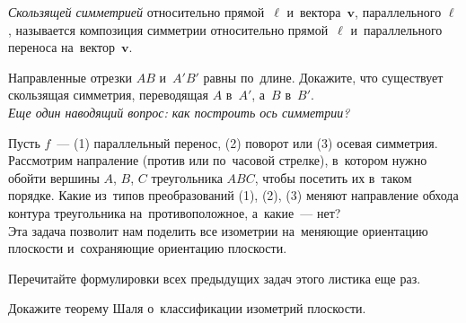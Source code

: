 \emph{Скользящей симметрией} относительно прямой~$\ell$ и~вектора~$\mathbf{v}$,
параллельного $\ell$, называется композиция симметрии относительно
прямой~$\ell$ и~параллельного переноса на~вектор~$\mathbf{v}$.

\begin{problems}

\item
Направленные отрезки $AB$ и~$A'B'$ равны по~длине.
Докажите, что существует скользящая симметрия, переводящая $A$ в~$A'$,
а~$B$ в~$B'$.
\\
\emph{Еще один наводящий вопрос: как построить ось симметрии?}

\item
Пусть $f$~---\enspace
(1) параллельный перенос,
\enspace
(2) поворот
\enspace или\enspace
(3) осевая симметрия.
\\
Рассмотрим напраление (против или по~часовой стрелке), в~котором нужно обойти
вершины $A$, $B$, $C$ треугольника $ABC$, чтобы посетить их в~таком порядке.
Какие из~типов преобразований (1), (2), (3) меняют направление обхода контура
треугольника на~противоположное, а~какие~--- нет?
\\
Эта задача позволит нам поделить все изометрии на~меняющие ориентацию плоскости
и~сохраняющие ориентацию плоскости.

\item
Перечитайте формулировки всех предыдущих задач этого листика еще раз.

\item
Докажите теорему Шаля о~классификации изометрий плоскости.

\end{problems}

